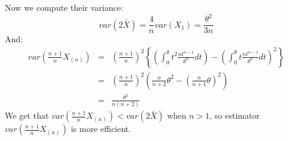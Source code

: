 \documentclass[12pt]{article}
\newcommand{\var}[1]{var \left( #1 \right)}
\begin{document}
\begin{enumerate}
    Now we compute their variance:
    $$\var{2 \bar{X}} = \frac{4}{n} \var{X_1} = \frac{\theta^2}{3 n}$$
    And:
    \begin{eqnarray}
        \var{\frac{n+1}{n} X_{(n)}} &=& (\frac{n+1}{n})^2 \left\{(\int_0^\theta t^2 \frac{n t^{n-1}}{\theta^n} d t) - (\int_0^\theta t \frac{n t^{n-1}}{\theta^n} d t)^2 \right\} \\        
                                    &=& (\frac{n+1}{n})^2 \left(\frac{n}{n+2} \theta^2 - (\frac{n}{n+1} \theta)^2 \right) \\
                                    &=& \frac{\theta^2}{n(n+2)}
    \end{eqnarray}
    We get that $\var{\frac{n+1}{n} X_{(n)}} < \var{2 \bar{X}}$ when $n > 1$, so estimator $\var{\frac{n+1}{n} X_{(n)}}$ is more efficient.

\end{enumerate}
    
\end{document}

